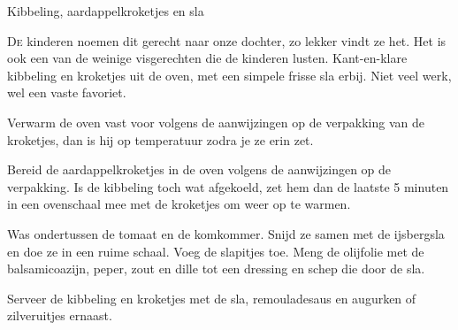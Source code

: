 \begin{recipe}{Kibbeling, aardappelkroketjes en sla}


\lettrine{D}{e} kinderen noemen dit gerecht naar onze dochter, zo lekker vindt ze
het. Het is ook een van de weinige visgerechten die de kinderen lusten.
Kant-en-klare kibbeling en kroketjes uit de oven, met een simpele frisse sla
erbij. Niet veel werk, wel een vaste favoriet.

\begin{ingredients}
\end{ingredients}

\begin{steps}
  \item Verwarm de oven vast voor volgens de aanwijzingen op de verpakking van
        de kroketjes, dan is hij op temperatuur zodra je ze erin zet.
  \item Bereid de aardappelkroketjes in de oven volgens de aanwijzingen op de
        verpakking. Is de kibbeling toch wat afgekoeld, zet hem dan de laatste
        5 minuten in een ovenschaal mee met de kroketjes om weer op te warmen.
  \item Was ondertussen de tomaat en de komkommer. Snijd ze samen met de
        ijsbergsla en doe ze in een ruime schaal. Voeg de slapitjes toe. Meng
        de olijfolie met de balsamicoazijn, peper, zout en dille tot een
        dressing en schep die door de sla.
  \item Serveer de kibbeling en kroketjes met de sla, remouladesaus en augurken
        of zilveruitjes ernaast.
\end{steps}
\end{recipe}

